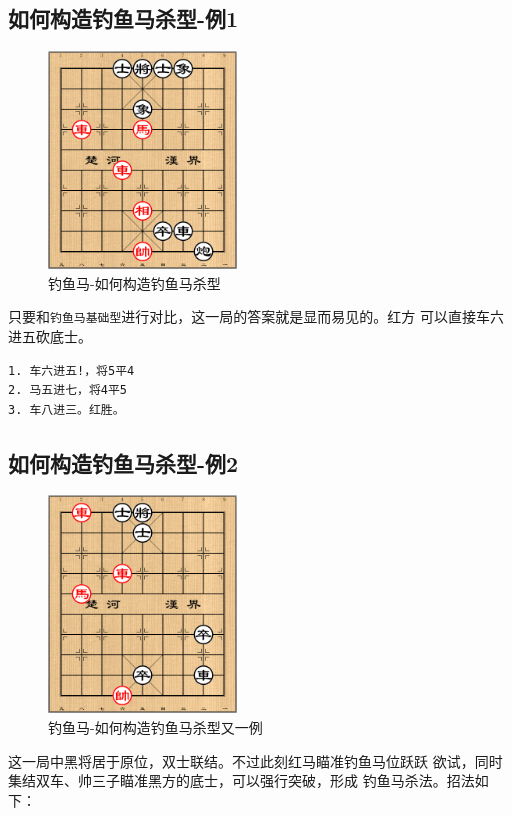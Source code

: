 \documentclass[a5paper,twoside]{book}
\begin{document}
\subsection{如何构造钓鱼马杀型-例1}
\label{sec-3-2-1}

\begin{figure}[H]
\centering
\includegraphics[width=5cm]{pic/钓鱼马-如何构造钓鱼马杀型.png}
\caption{钓鱼马-如何构造钓鱼马杀型}
\end{figure}

只要和\texttt{钓鱼马基础型}进行对比，这一局的答案就是显而易见的。红方
可以直接车六进五砍底士。

\begin{verbatim}
1. 车六进五!，将5平4
2. 马五进七，将4平5
3. 车八进三。红胜。
\end{verbatim}


\subsection{如何构造钓鱼马杀型-例2}
\label{sec-3-2-2}

\begin{figure}[H]
\centering
\includegraphics[width=5cm]{pic/钓鱼马-如何构造钓鱼马杀型又一例.png}
\caption{钓鱼马-如何构造钓鱼马杀型又一例}
\end{figure}


这一局中黑将居于原位，双士联结。不过此刻红马瞄准钓鱼马位跃跃
欲试，同时集结双车、帅三子瞄准黑方的底士，可以强行突破，形成
钓鱼马杀法。招法如
下：
\end{document}
